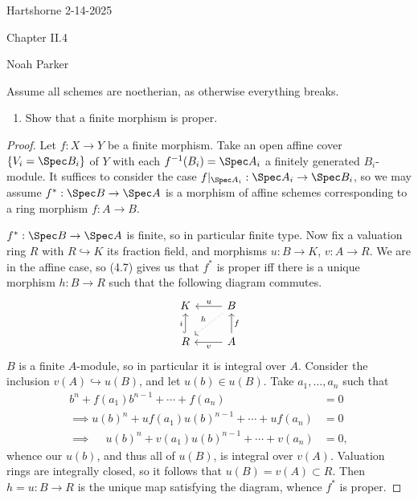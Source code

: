 \documentclass[12pt]{amsart}
\begin{document}
{Hartshorne} \hfill {2-14-2025}

\bigskip\bigskip

\begin{center}

{\sc Chapter II.4}

\end{center}

\begin{center}

  {Noah Parker} %
    
\end{center}

\bigskip
Assume all schemes are noetherian, as otherwise everything breaks.
\bigskip


\begin{enumerate}
  \item[4.1.] {
      Show that a finite morphism is proper.
    }
\end{enumerate}

\begin{proof}
  Let $f:X\to Y$ be a finite morphism.
  Take an open affine cover $\{V_i=\Spec B_i\}$ of $Y$ with each $f^{-1}(B_i)=\Spec A_i$ a finitely generated $B_i$-module.
  It suffices to consider the case $f|_{\Spec A_i}:\Spec A_i\to \Spec B_i$, so we may assume $f^*:\Spec B\to \Spec A$ is a morphism of affine schemes corresponding to a ring morphism $f:A\to B$.
  
  $f^*:\Spec B\to \Spec A$ is finite, so in particular finite type.
  Now fix a valuation ring $R$ with $R\hookrightarrow K$ its fraction field, and morphisms $u:B\to K$, $v:A\to R$.
  We are in the affine case, so (4.7) gives us that $f^*$ is proper iff there is a unique morphism $h:B\to R$ such that the following diagram commutes.
  \[
    \begin{tikzcd}
      K & B\ar[l,"u"']\ar[dl,dotted,"h"'] \\
      R\ar[u,hook,"i"] & A\ar[l,"v"]\ar[u,"f"']
    \end{tikzcd}
  \] 
  $B$ is a finite $A$-module, so in particular it is integral over $A$.
  Consider the inclusion $v(A)\hookrightarrow u(B)$, and let $u(b)\in u(B)$.
  Take $a_1,\ldots, a_n$ such that
  \begin{align*}
    b^n + f(a_1)b^{n-1}+\cdots +f(a_n) &= 0 \\
    \implies u(b)^n +uf(a_1)u(b)^{n-1}+\cdots+uf(a_n)&= 0 \\
    \implies~\;~\;~ u(b)^n + v(a_1)u(b)^{n-1}+\cdots + v(a_n)&=0,
  \end{align*}
  whence our $u(b)$, and thus all of $u(B)$, is integral over $v(A)$.
  Valuation rings are integrally closed, so it follows that $u(B)=v(A)\subset R$.
  Then $h=u:B\to R$ is the unique map satisfying the diagram, whence $f^*$ is proper.
\end{proof}
\end{document}
